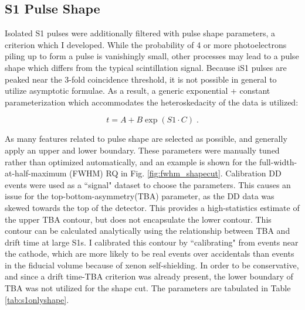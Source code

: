 \subsection{S1 Pulse Shape}

Isolated S1 pulses were additionally filtered with pulse shape parameters, a criterion which I developed.
While the probability of 4 or more photoelectrons piling up to form a pulse is vanishingly small, other processes may lead to a pulse shape which differs from the typical scintillation signal.
Because iS1 pulses are peaked near the 3-fold coincidence threshold, it is not possible in general to utilize asymptotic formulae.
As a result,  a generic exponential + constant parameterization which accommodates the heteroskedacity of the data is utilized:

\begin{equation}
    t = A + B\exp(S1 \cdot C)\;.
    \label{eq:expconst}
\end{equation}

As many features related to pulse shape are selected as possible, and generally apply an upper and lower boundary.
These parameters were manually tuned rather than optimized automatically, and an example is shown for the full-width-at-half-maximum (FWHM) RQ in Fig. \ref{fig:fwhm_shapecut}.
Calibration DD events were used as a ``signal" dataset to choose the parameters.
This causes an issue for the top-bottom-asymmetry(TBA) parameter, as the DD data was skewed towards the top of the detector.
This provides a high-statistics estimate of the upper TBA contour, but does not encapsulate the lower contour.
This contour can be calculated analytically using the relationship between TBA and drift time at large S1s.
I calibrated this contour by ``calibrating" from events near the cathode, which are more likely to be real events over accidentals than events in the fiducial volume because of xenon self-shielding.
In order to be conservative, and since a drift time-TBA criterion was already present, the lower boundary of TBA was not utilized for the shape cut.
The parameters are tabulated in Table \ref{tab:s1onlyshape}.


